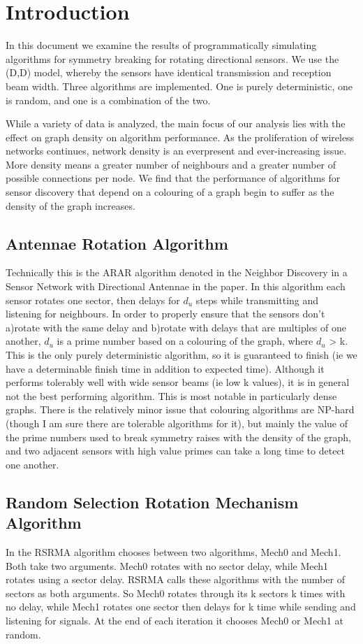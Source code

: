 \section{Introduction}
In this document we examine the results of programmatically simulating algorithms for symmetry breaking for rotating directional sensors. We use the (D,D) model, whereby the sensors have identical transmission and reception beam width. Three algorithms are implemented. One is purely deterministic, one is random, and one is a combination of the two. 

While a variety of data is analyzed, the main focus of our analysis lies with the effect on graph density on algorithm performance. As the proliferation of wireless networks continues, network density is an everpresent and ever-increasing issue. More density means a greater number of neighbours and a greater number of possible connections per node. We find that the performance of algorithms for sensor discovery that depend on a colouring of a graph begin to suffer as the density of the graph increases. 

\subsection{Antennae Rotation Algorithm}
Technically this is the ARAR algorithm denoted in the Neighbor Discovery in a Sensor Network with Directional Antennae in the paper.
In this algorithm each sensor rotates one sector, then delays for $d_{u}$ steps while transmitting and listening for neighbours. In order to properly ensure that the sensors don't a)rotate with the same delay and b)rotate with delays that are multiples of one another, $d_{u}$ is a prime number based on a colouring of the graph, where  $d_{u}$ > k. This is the only purely deterministic algorithm, so it is guaranteed to finish (ie we have a determinable finish time in addition to expected time). Although it performs tolerably well with wide sensor beams (ie low k values), it is in general not the best performing algorithm. This is most notable in particularly dense graphs. There is the relatively minor issue that colouring algorithms are NP-hard (though I am sure there are tolerable algorithms for it), but mainly the value of the prime numbers used to break symmetry raises with the density of the graph, and two adjacent sensors with high value primes can take a long time to detect one another. 

\subsection{Random Selection Rotation Mechanism Algorithm}
In the RSRMA algorithm chooses between two algorithms, Mech0 and Mech1. Both take two arguments. Mech0 rotates with no sector delay, while Mech1 rotates using a sector delay. RSRMA calls these algorithms with the number of sectors as both arguments. So Mech0 rotates through its k sectors k times with no delay, while Mech1 rotates one sector then delays for k time while sending and listening for signals. At the end of each iteration it chooses Mech0 or Mech1 at random.

